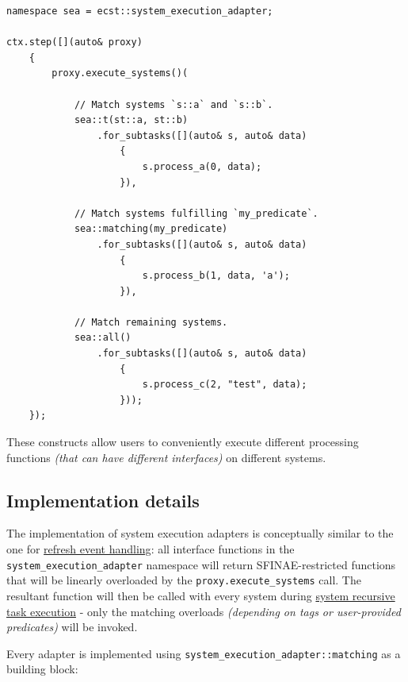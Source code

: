 \documentclass[oneside, 12pt, a4paper, openany]{book}
\begin{document}
\begin{verbatim}
namespace sea = ecst::system_execution_adapter;

ctx.step([](auto& proxy)
    {
        proxy.execute_systems()(

            // Match systems `s::a` and `s::b`.
            sea::t(st::a, st::b)
                .for_subtasks([](auto& s, auto& data)
                    {
                        s.process_a(0, data);
                    }),

            // Match systems fulfilling `my_predicate`.
            sea::matching(my_predicate)
                .for_subtasks([](auto& s, auto& data)
                    {
                        s.process_b(1, data, 'a');
                    }),

            // Match remaining systems.
            sea::all()
                .for_subtasks([](auto& s, auto& data)
                    {
                        s.process_c(2, "test", data);
                    }));
    });
\end{verbatim}

These constructs allow users to conveniently execute different
processing functions \emph{(that can have different interfaces)} on
different systems.

\subsection{Implementation details}\label{implementation-details-2}

The implementation of system execution adapters is conceptually similar
to the one for \protect\hyperlink{advf_refresh_event_handling}{refresh
event handling}: all interface functions in the
\texttt{system_execution_adapter}
namespace will return SFINAE-restricted functions that will be linearly
overloaded by the
\texttt{proxy.execute_systems}
call. The resultant function will then be called with every system
during
\protect\hyperlink{multithreading_recursive_task_execution}{system
recursive task execution} - only the matching overloads \emph{(depending
on tags or user-provided predicates)} will be invoked.

Every adapter is implemented using
\texttt{system_execution_adapter::matching}
as a building block:
\end{document}
